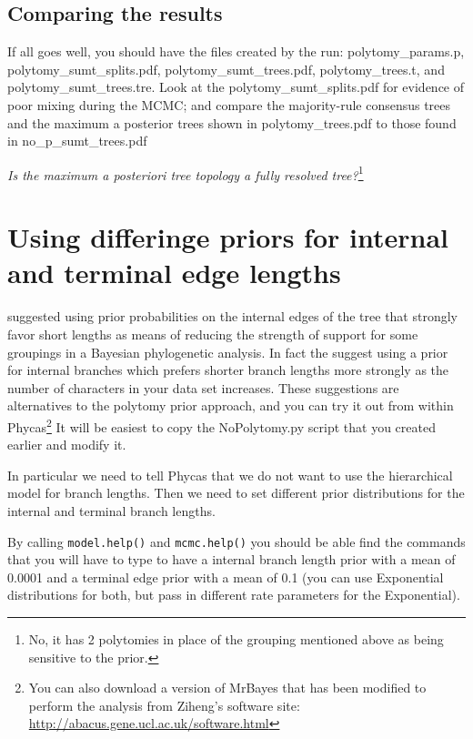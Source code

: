 \documentclass{article}
\newcommand{\cmd}[1]{\texttt{#1}\xspace}
\newcommand{\mb}{MrBayes\xspace}
\newcommand{\phycas}{Phycas\xspace}
\newcommand{\localfile}[1]{\textsf{#1}\xspace}
\newcommand{\QandA}[2]{\textit{#1}\footnote{#2}\xspace}
\begin{document}
\subsection{Comparing the results}
If all goes well, you should have the files created by the run:
\localfile{polytomy\_params.p}, \localfile{polytomy\_sumt\_splits.pdf}, \localfile{polytomy\_sumt\_trees.pdf}, \localfile{polytomy\_trees.t}, and \localfile{polytomy\_sumt\_trees.tre}.
Look at the \localfile{polytomy\_sumt\_splits.pdf}  for evidence of poor mixing  during the MCMC; 
and compare the majority-rule consensus trees and the maximum a posterior trees shown in  \localfile{polytomy\_trees.pdf} to those found in \localfile{no\_p\_sumt\_trees.pdf}

\QandA{Is the maximum a posteriori tree topology a fully resolved tree?}{No, it has 2 polytomies in place of the grouping mentioned above as being sensitive to the prior.}
\section{Using differinge priors for internal and terminal edge lengths}
\citet{YangR2005} \citep[and][]{Yang2007} suggested using prior probabilities on the internal edges of the tree that strongly favor short lengths as means of reducing the strength
of support for some groupings in a Bayesian phylogenetic analysis.
In fact the suggest using a prior for internal branches which prefers shorter branch lengths more
strongly as the number of characters in your data set increases.
These suggestions are alternatives to the polytomy prior approach, and you can try it out from within 
\phycas\footnote{You can also download a version of \mb that has been modified to perform the analysis from Ziheng's software site: \url{http://abacus.gene.ucl.ac.uk/software.html}}
It will be easiest to copy the \localfile{NoPolytomy.py} script that you created earlier 
and modify it.

In particular we need to tell \phycas that we do not want to use the hierarchical model for
branch lengths.
Then we need to set different prior distributions for the internal and terminal branch lengths.

By calling \cmd{model.help()} and \cmd{mcmc.help()} you should be able find the commands that you will have to type to have a internal branch length prior with a mean of 0.0001 and a terminal edge prior with a mean of 0.1 (you can use Exponential distributions for both, but pass in different rate parameters for the Exponential).
\end{document}
